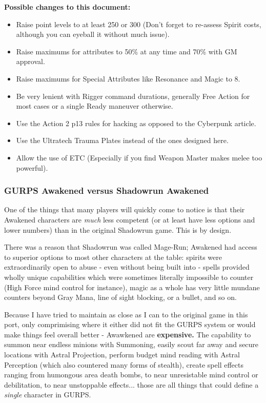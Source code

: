 \begin{multicols}{2}
	\textbf{Possible changes to this document:}
	\begin{itemize}
		\itemsep 0pt
		\item Raise point levels to at least 250 or 300 (Don't forget to re-assess Spirit costs, although you can eyeball it without much issue). 
		\item Raise maximums for attributes to 50\% at any time and 70\% with GM approval.
		\item Raise maximums for Special Attributes like Resonance and Magic to 8.
		\item Be very lenient with Rigger command durations, generally Free Action for most cases or a single Ready maneuver otherwise.
		\item Use the Action 2 p13 rules for hacking as opposed to the Cyberpunk article.
		\item Use the Ultratech Trauma Plates instead of the ones designed here.
		\item Allow the use of ETC (Especially if you find Weapon Master makes melee too powerful).
	\end{itemize}
	
	\subsubsection{GURPS Awakened versus Shadowrun Awakened}\label{gurps_awakened}
	
	One of the things that many players will quickly come to notice is that their Awakened characters are \textit{much} less competent (or at least have less options and lower numbers) than in the original Shadowrun game. This is by design. 
	
	There was a reason that Shadowrun was called Mage-Run; Awakened had access to superior options to most other characters at the table: spirits were extraordinarily open to abuse - even without being built into - spells provided wholly unique capabilities which were sometimes literally impossible to counter (High Force mind control for instance), magic as a whole has very little mundane counters beyond Gray Mana, line of sight blocking, or a bullet, and so on.
	
	Because I have tried to maintain as close as I can to the original game in this port, only comprimising where it either did not fit the GURPS system or would make things feel overall better - Awawkened are \textbf{expensive.} The capability to summon near endless minions with Summoning, easily scout far away and secure locations with Astral Projection, perform budget mind reading with Astral Perception (which also countered many forms of stealth), create spell effects ranging from humongous area death bombs, to near unresistable mind control or debilitation, to near unstoppable effects... those are all things that could define a \textit{single} character in GURPS.
	

\end{multicols}
